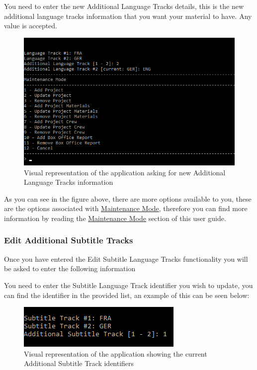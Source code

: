 \documentclass[
  english,
  a4paper,
,tablecaptionabove
]{scrartcl}
\begin{document}
You need to enter the new Additional Language Tracks details, this is
the new additional language tracks information that you want your
material to have. Any value is accepted.

\begin{figure}
\centering
\includegraphics{images/user-guide/maintenance-mode/update-project-material-additional-language-tracks.png}
\caption{Visual representation of the application asking for new
Additional Language Tracks information}
\end{figure}

As you can see in the figure above, there are more options available to
you, these are the options associated with
\protect\hyperlink{using-maintenance-mode}{Maintenance Mode}, therefore
you can find more information by reading the
\protect\hyperlink{using-maintenance-mode}{Maintenance Mode} section of
this user guide.

\newpage

\hypertarget{edit-additional-subtitle-tracks-1}{%
\subsubsection{Edit Additional Subtitle
Tracks}\label{edit-additional-subtitle-tracks-1}}

Once you have entered the Edit Subtitle Language Tracks functionality
you will be asked to enter the following information

You need to enter the Subtitle Language Track identifier you wish to
update, you can find the identifier in the provided list, an example of
this can be seen below:

\begin{figure}
\centering
\includegraphics{images/user-guide/maintenance-mode/update-project-material-additional-subtitle-track-select-id.png}
\caption{Visual representation of the application showing the current
Additional Subtitle Track identifiers}
\end{figure}
\end{document}
